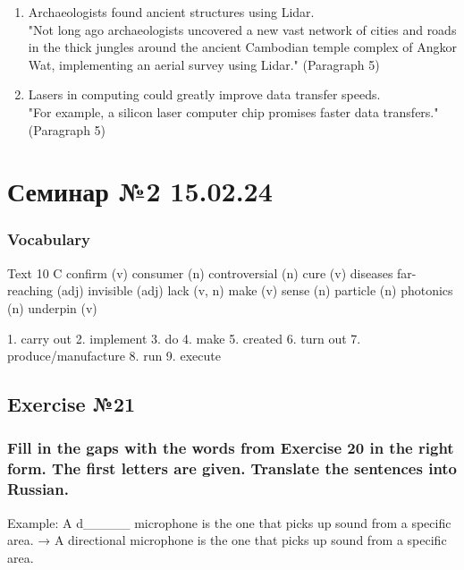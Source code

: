 \begin{enumerate}
      \item Archaeologists found ancient structures using Lidar. \\
            "Not long ago archaeologists uncovered a new vast network of cities and
            roads in the thick jungles around the ancient Cambodian temple complex
            of Angkor Wat, implementing an aerial survey using Lidar." (Paragraph 5)
      \item Lasers in computing could greatly improve data transfer speeds. \\
            "For example, a silicon laser computer chip promises faster data
            transfers." (Paragraph 5)
\end{enumerate}

\chapter{Семинар №2 15.02.24}

\subsection*{Vocabulary}

Text 10 C
confirm (v)
consumer (n)
controversial (n)
cure (v) diseases
far-reaching (adj)
invisible (adj)
lack (v, n)
make (v) sense (n)
particle (n)
photonics (n)
underpin (v)

1. carry out
2. implement
3. do
4. make
5. created
6. turn out
7. produce/manufacture
8. run
9. execute

\section*{Exercise №21}

\subsection*{Fill in the gaps with the words from Exercise 20 in the right form. The
      first letters are given. Translate the sentences into Russian.}
Example: A d\_\_\_\_\_ microphone is the one that picks up sound from a specific area.
→ A directional microphone is the one that picks up sound from a specific area.

